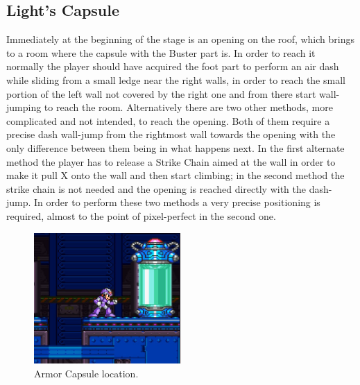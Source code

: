 \subsection{Light's Capsule}\label{X2:Arm_parts}
Immediately at the beginning of the stage is an opening on the roof, which brings to a room where the capsule with the Buster part is. In order to reach it normally the player should have acquired the foot part to perform an air dash while sliding from a small ledge near the right walls, in order to reach the small portion of the left wall not covered by the right one and from there start wall-jumping to reach the room. Alternatively there are two other methods, more complicated and not intended, to reach the opening. Both of them require a precise dash wall-jump from the rightmost wall towards the opening with the only difference between them being in what happens next. In the first alternate method the player has to release a Strike Chain aimed at the wall in order to make it pull X onto the wall and then start climbing; in the second method the strike chain is not needed and the opening is reached directly with the dash-jump. In order to perform these two methods a very precise positioning is required, almost to the point of pixel-perfect in the second one.
\begin{figure}[htp]
	\centering
	\includegraphics[height=5cm]{figures/X2/Wheel_gator/Gator_capsule.jpg}
	\caption{Armor Capsule location.}
\end{figure}

